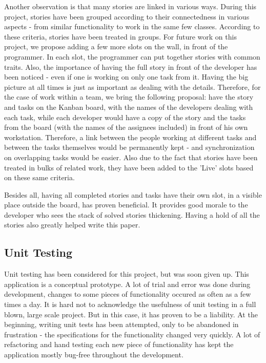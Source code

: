 \documentclass{article}
\begin{document}
Another observation is that many stories are linked in various ways.
During this project, stories have been grouped according to their connectedness
in various aspects - from similar functionality to work in the same few classes.
According to these criteria, stories have been treated in groups. For future
work on this project, we propose adding a few more slots on the wall, in front
of the programmer. In each slot, the programmer can put together stories with
common traits. Also, the importance of having the full story in front of the
developer has been noticed - even if one is working on only one task from it.
Having the big picture at all times is just as important as dealing with the
details. Therefore, for the case of work within a team, we bring the following
proposal: have the story and tasks on the Kanban board, with the names of the
developers dealing with each task, while each developer would have a copy of the
story and the tasks from the board (with the names of the assignees included) in
front of his own workstation. Therefore, a link between the people working at
different tasks and between the tasks themselves would be permanently kept - and
synchronization on overlapping tasks would be easier. Also due to the fact that
stories have been treated in bulks of related work, they have been added to the
'Live' slots based on these same criteria. \newline

Besides all, having all completed stories and tasks have their own slot, in
a visible place outside the board, has proven beneficial. It provides good
morale to the developer who sees the stack of solved stories thickening.
Having a hold of all the stories also greatly helped write this paper. \newline

\subsection{Unit Testing}

Unit testing has been considered for this project, but was soon given up. This
application is a conceptual prototype. A lot of trial and error was done during
development, changes to some pieces of functionality occured as often as a few
times a day. It is hard not to acknowledge the usefulness of unit testing in a
full blown, large scale project. But in this case, it has proven to be a
liability. At the beginning, writing unit tests has been attempted, only to be
abandoned in frustration -  the specifications for the functionality changed
very quickly. A lot of refactoring and hand testing each new piece of
functionality has kept the application mostly bug-free throughout the
development.
\end{document}
